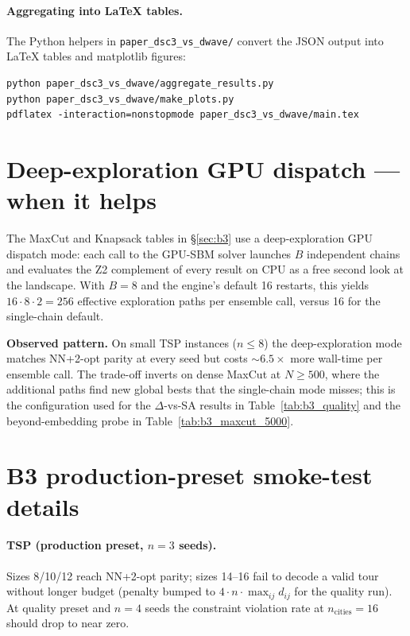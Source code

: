 \documentclass[11pt,a4paper]{article}
\begin{document}
\paragraph{Aggregating into LaTeX tables.}
The Python helpers in \texttt{paper\_dsc3\_vs\_dwave/} convert the JSON
output into LaTeX tables and matplotlib figures:

\begin{lstlisting}
python paper_dsc3_vs_dwave/aggregate_results.py
python paper_dsc3_vs_dwave/make_plots.py
pdflatex -interaction=nonstopmode paper_dsc3_vs_dwave/main.tex
\end{lstlisting}

\section{Deep-exploration GPU dispatch — when it helps}
\label{appx:batched_gpu}

The MaxCut and Knapsack tables in \S\ref{sec:b3} use a deep-exploration
GPU dispatch mode: each call to the GPU-SBM solver launches $B$
independent chains and evaluates the Z2 complement of every result on
CPU as a free second look at the landscape. With $B\!=\!8$ and the
engine's default 16 restarts, this yields $16\!\cdot\!8\!\cdot\!2 = 256$
effective exploration paths per ensemble call, versus 16 for the
single-chain default.

\noindent\textbf{Observed pattern.} On small TSP instances ($n\!\le\!8$)
the deep-exploration mode matches NN+2-opt parity at every seed but
costs $\sim 6.5\times$ more wall-time per ensemble call. The trade-off
inverts on dense MaxCut at $N\!\ge\!500$, where the additional paths
find new global bests that the single-chain mode misses; this is the
configuration used for the $\Delta$-vs-SA results in
Table~\ref{tab:b3_quality} and the beyond-embedding probe in
Table~\ref{tab:b3_maxcut_5000}.

\section{B3 production-preset smoke-test details}
\label{appx:b3_smoke}

\paragraph{TSP (production preset, $n=3$ seeds).} Sizes 8/10/12 reach
NN+2-opt parity; sizes 14--16 fail to decode a valid tour without longer
budget (penalty bumped to $4\cdot n\cdot\max_{ij}d_{ij}$ for the
quality run). At quality preset and $n\!=\!4$ seeds the constraint
violation rate at $n_{\mathrm{cities}}\!=\!16$ should drop to near zero.
\end{document}
